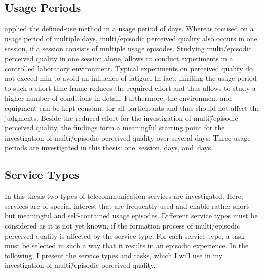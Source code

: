 \subsection{Usage Periods}
\citet{moller_single-call_2011} applied the defined-use method in a usage period of \unit[12]{days}. 
Whereas \citet{moller_single-call_2011} focused on a usage period of multiple days, multi\=/episodic perceived quality also occurs in one session, if a session consists of multiple usage episodes.
Studying multi\=/episodic perceived quality in one session alone, allows to conduct experiments in a controlled laboratory environment. %
Typical experiments on perceived quality do not exceed \unit[90]{min} to avoid an influence of fatigue.
In fact, limiting the usage period to such a short time-frame reduces the required effort and thus allows to study a higher number of conditions in detail.
Furthermore, the environment and equipment can be kept constant for all participants and thus should not affect the judgments.
Beside the reduced effort for the investigation of multi\=/episodic perceived quality, the findings form a meaningful starting point for the investigation of multi\=/episodic perceived quality over several days.
Three usage periods are investigated in this thesis: one~session, \unit[6]{days}, and~\unit[14]{days}.

\subsection{Service Types}
In this thesis two types of telecommunication services are investigated.
Here, services are of special interest that are frequently used and enable rather short but meaningful and self-contained usage episodes.
Different service types must be considered as it is not yet known, if the formation process of multi\=/episodic perceived quality is affected by the service type.
For each service type, a task must be selected in such a way that it results in an episodic experience.
In the following, I present the service types and tasks, which I will use in my investigation of multi\=/episodic perceived quality.

